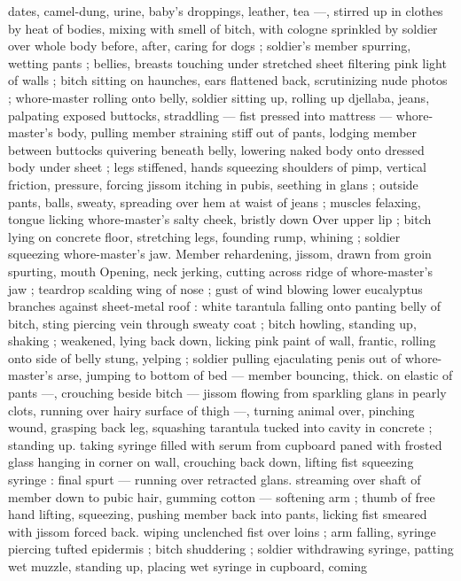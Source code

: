 dates, camel-dung, urine, baby's droppings, leather, tea ---, stirred 
up in clothes by heat of bodies, mixing with smell of bitch, with 
cologne sprinkled by soldier over whole body before, after, caring for 
dogs ; soldier's member spurring, wetting pants ; bellies, breasts 
touching under stretched sheet filtering pink light of walls ; bitch 
sitting on haunches, ears flattened back, scrutinizing nude photos ; 
whore-master rolling onto belly, soldier sitting up, rolling up djellaba, 
jeans, palpating exposed buttocks, straddling --- fist pressed into 
mattress --- whore-master's body, pulling member straining stiff out 
of pants, lodging member between buttocks quivering beneath belly, 
lowering naked body onto dressed body under sheet ; legs stiffened, 
hands squeezing shoulders of pimp, vertical friction, pressure, 
forcing jissom itching in pubis, seething in glans ; outside pants, 
balls, sweaty, spreading over hem at waist of jeans ; muscles 
felaxing, tongue licking whore-master's salty cheek, bristly down 
Over upper lip ; bitch lying on concrete floor, stretching legs, 
founding rump, whining ; soldier squeezing whore-master's jaw. 
Member rehardening, jissom, drawn from groin spurting, mouth 
Opening, neck jerking, cutting across ridge of whore-master's jaw ; 
teardrop scalding wing of nose ; gust of wind blowing lower 
eucalyptus branches against sheet-metal roof : white tarantula 
falling onto panting belly of bitch, sting piercing vein through sweaty 
coat ; bitch howling, standing up, shaking ; weakened, lying back 
down, licking pink paint of wall, frantic, rolling onto side of belly 
stung, yelping ; soldier pulling ejaculating penis out of whore- 
master's arse, jumping to bottom of bed --- member bouncing, thick. 
on elastic of pants ---, crouching beside bitch --- jissom flowing from 
sparkling glans in pearly clots, running over hairy surface of thigh 
---, turning animal over, pinching wound, grasping back leg, 
squashing tarantula tucked into cavity in concrete ; standing up. 
taking syringe filled with serum from cupboard paned with frosted 
glass hanging in corner on wall, crouching back down, lifting fist 
squeezing syringe : final spurt --- running over retracted glans. 
streaming over shaft of member down to pubic hair, gumming cotton 
--- softening arm ; thumb of free hand lifting, squeezing, pushing 
member back into pants, licking fist smeared with jissom forced back. 
wiping unclenched fist over loins ; arm falling, syringe piercing tufted 
epidermis ; bitch shuddering ; soldier withdrawing syringe, patting 
wet muzzle, standing up, placing wet syringe in cupboard, coming 
